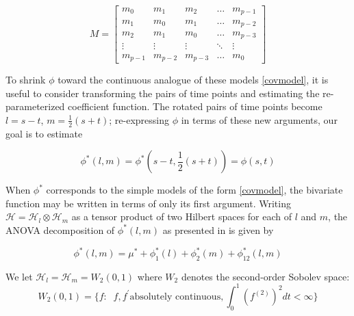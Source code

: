 \documentclass[12pt]{article}
\begin{document}
\begin{equation}
M = \begin{bmatrix} m_0 & m_1 & m_2 & \dots & m_{p-1}\\ m_1 & m_0 & m_1 & \dots & m_{p-2}\\m_2 & m_1 & m_0 & \dots & m_{p-3}\\ \vdots & \vdots & \vdots & \ddots & \vdots\\  m_{p-1} & m_{p-2} & m_{p-3} & \dots & m_0 \end{bmatrix} \label{toeplitz}
\end{equation}

To shrink $\phi$ toward the continuous analogue of these models \eqref{covmodel}, it is useful to consider transforming the pairs of time points and estimating the re-parameterized coefficient function. The rotated pairs of time points become $l = s-t$, $m = \frac{1}{2}\left(s+t\right)$; re-expressing $\phi$ in terms of these new arguments, our goal is to estimate

\begin{equation}
\phi^*\left(l,m\right) = \phi^*\left(s-t, \frac{1}{2}\left(s+t\right)\right) = \phi\left(s,t\right)
\end{equation}

When $\phi^*$ corresponds to the simple models of the form \eqref{covmodel}, the bivariate function may be written in terms of only its first argument. Writing $\mathcal{H} = \mathcal{H}_l \otimes \mathcal{H}_m$ as a tensor product of two Hilbert spaces for each of $l$ and $m$, the ANOVA decomposition of $\phi^*\left(l,m\right) $ as presented in \citet{gu2002smoothing} is given by 

\begin{equation}
\phi^*\left(l,m\right) = \mu^* + \phi_1^*\left(l\right) + \phi_2^*\left(m\right) + \phi_{12}^*\left(l,m\right)   \label{ANOVA}
\end{equation}
\noindent 

We let $\mathcal{H}_l = \mathcal{H}_m = W_2\left(0,1\right)$ where $W_2$ denotes the second-order Sobolev space:
\[
W_2\left(0,1\right) = \lbrace f: \;\;f, f^\prime \mbox{absolutely continuous}, \int_0^1 \left(f^{\left( 2 \right)}\right)^2 dt < \infty \rbrace
\]  
\end{document}
